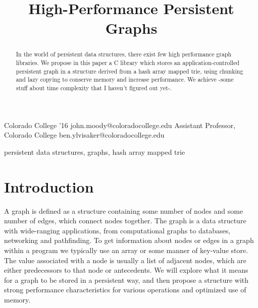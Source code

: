 \documentclass[preprint]{sigplanconf}
\begin{document}
\setlength{\pdfpageheight}{\paperheight}
\setlength{\pdfpagewidth}{\paperwidth}




\title{High-Performance Persistent Graphs}
\subtitle{}

           {Colorado College '16}
           {john.moody@coloradocollege.edu}
           {Assistant Professor, Colorado College}
           {ben.ylvisaker@coloradocollege.edu}

\maketitle


\begin{abstract}
In the world of persistent data structures, there exist few high performance graph libraries.
We propose in this paper a C library which stores an application-controlled persistent graph in a structure derived from a hash array mapped trie, using chunking and lazy copying to conserve memory and increase performance.
We achieve -some stuff about time complexity that I haven't figured out yet-.
\end{abstract}


\keywords
persistent data structures, graphs, hash array mapped trie

\section{Introduction}

A graph is defined as a structure containing some number of nodes and some number of edges, which connect nodes together.
The graph is a data structure with wide-ranging applications, from computational graphs to databases, networking and pathfinding.
To get information about nodes or edges in a graph within a program we typically use an array or some manner of key-value store.
The value associated with a node is usually a list of adjacent nodes, which are either predecessors to that node or antecedents.
We will explore what it means for a graph to be stored in a persistent way, and then propose a structure with strong performance characteristics for various operations and optimized use of memory.
\end{document}
